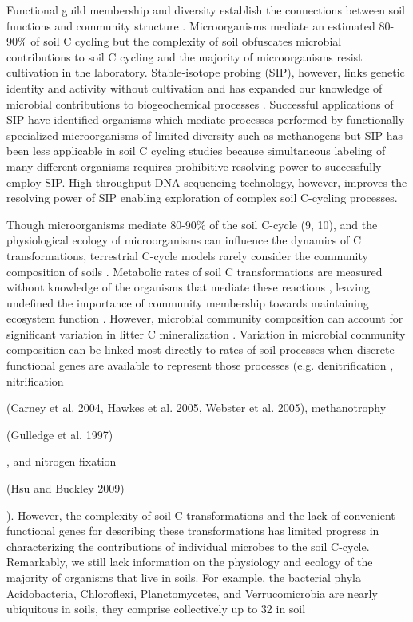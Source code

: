 Functional guild membership and diversity establish the connections between
soil functions and community structure \citep{O_Donnell_2002}. Microorganisms
mediate an estimated 80-90\% of soil C cycling
\citep{ColemanCrossley_1996,Nannipieri_2003} but the complexity of soil
obfuscates microbial contributions to soil C cycling and the majority of
microorganisms resist cultivation in the laboratory. Stable-isotope probing
(SIP), however, links genetic identity and activity without cultivation and has
expanded our knowledge of microbial contributions to biogeochemical processes
\citep{Chen_Murrell_2010}. Successful applications of SIP have identified
organisms which mediate processes performed by functionally specialized
microorganisms of limited diversity such as methanogens \citep{Lu_2005} but SIP
has been less applicable in soil C cycling studies because simultaneous
labeling of many different organisms requires prohibitive resolving power to
successfully employ SIP. High throughput DNA sequencing technology, however,
improves the resolving power of SIP enabling exploration of complex soil
C-cycling processes.

Though microorganisms mediate 80-90\% of the soil C-cycle (9, 10), and the
physiological ecology of microorganisms can influence the dynamics of
C transformations, terrestrial C-cycle models rarely consider the
community composition of soils \citep{Zak2006,Reed2007}. Metabolic rates
of soil C transformations are measured without knowledge of the organisms that
mediate these reactions \citep{Nannipieri_2003}, leaving undefined the
importance of community membership towards maintaining ecosystem function
\citep{Nannipieri_2003,Schimel_2012,Allison_2008}. However, microbial community
composition can account for significant variation in litter
C mineralization \citep{Strickland_2009}. Variation in microbial community
composition can be linked most directly to rates of soil processes when
discrete functional genes are available to represent those processes (e.g.
denitrification \citep{Cavigelli2000}, nitrification 

(Carney et al. 2004, Hawkes et al. 2005, Webster et al. 2005), methanotrophy

(Gulledge et al. 1997) 

, and nitrogen fixation 

(Hsu and Buckley 2009)

). However, the complexity of soil C transformations and the lack of convenient
functional genes for describing these transformations has limited progress in
characterizing the contributions of individual microbes to the soil C-cycle.
Remarkably, we still lack information on the physiology and ecology of the
majority of organisms that live in soils. For example, the bacterial phyla
Acidobacteria, Chloroflexi, Planctomycetes, and Verrucomicrobia are nearly
ubiquitous in soils, they comprise collectively up to 32%
in soil 

